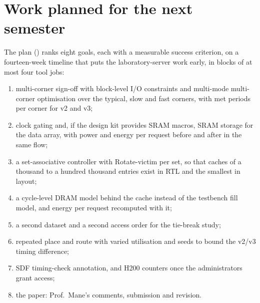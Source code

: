 \documentclass[11pt,a4paper]{report}
\begin{document}
\section{Work planned for the next semester}
The plan () ranks eight goals, each with a measurable success criterion, on a
fourteen-week timeline that puts the laboratory-server work early, in blocks of at most four tool jobs:
\begin{enumerate}[label=\alph*.]
\item multi-corner sign-off with block-level I/O constraints and multi-mode multi-corner optimisation over the
typical, slow and fast corners, with met periods per corner for v2 and v3;
\item clock gating and, if the design kit provides SRAM macros, SRAM storage for the data array, with power and energy
per request before and after in the same flow;
\item a set-associative controller with Rotate-victim per set, so that caches of a thousand to a hundred thousand entries exist in RTL and the smallest in layout;
\item a cycle-level DRAM model behind the cache instead of the testbench fill model, and energy per request
recomputed with it;
\item a second dataset and a second access order for the tie-break study;
\item repeated place and route with varied utilisation and seeds to bound the v2/v3 timing difference;
\item SDF timing-check annotation, and H200 counters once the administrators grant access;
\item the paper: Prof.\ Mane's comments, submission and revision.\enlargethispage{2\baselineskip}
\end{enumerate}


\appendix
\end{document}
